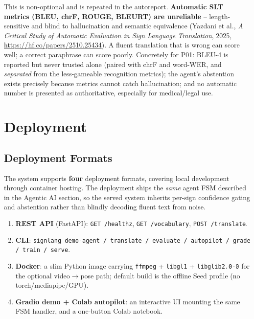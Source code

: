 \documentclass[12pt,a4paper]{article}
\begin{document}
This is non-optional and is repeated in the autoreport. \textbf{Automatic SLT metrics (BLEU, chrF, ROUGE, BLEURT) are unreliable} -- length-sensitive and blind to hallucination and semantic equivalence (Yazdani et al., \emph{A Critical Study of Automatic Evaluation in Sign Language Translation}, 2025, \url{https://hf.co/papers/2510.25434}). A fluent translation that is wrong can score well; a correct paraphrase can score poorly. Concretely for P01: BLEU-4 is reported but never trusted alone (paired with chrF and word-WER, and \emph{separated} from the less-gameable recognition metrics); the agent's abstention exists precisely because metrics cannot catch hallucination; and no automatic number is presented as authoritative, especially for medical/legal use.

\section{Deployment}

\subsection{Deployment Formats}

The system supports \textbf{four} deployment formats, covering local development through container hosting. The deployment ships the \emph{same} agent FSM described in the Agentic AI section, so the served system inherits per-sign confidence gating and abstention rather than blindly decoding fluent text from noise.

\begin{enumerate}
  \item \textbf{REST API} (FastAPI): \texttt{GET /healthz}, \texttt{GET /vocabulary}, \texttt{POST /translate}.
  \item \textbf{CLI}: \texttt{signlang demo-agent / translate / evaluate / autopilot / grade / train / serve}.
  \item \textbf{Docker}: a slim Python image carrying \texttt{ffmpeg} + \texttt{libgl1} + \texttt{libglib2.0-0} for the optional video$\rightarrow$pose path; default build is the offline Seed profile (no torch/mediapipe/GPU).
  \item \textbf{Gradio demo + Colab autopilot}: an interactive UI mounting the same FSM handler, and a one-button Colab notebook.
\end{enumerate}
\end{document}
